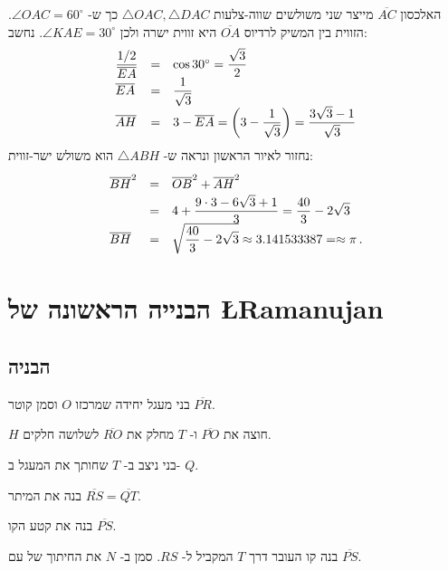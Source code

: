 האלכסון
$\overline{AC}$
מייצר שני משולשים שווה-צלעות
$\triangle OAC, \triangle DAC$
כך ש-%
$\angle OAC=60^\circ$.
הזווית בין המשיק לרדיוס
$\overline{OA}$
היא זווית ישרה ולכן
$\angle KAE=30^\circ$.
נחשב:
\begin{displaymath}
\renewcommand{\arraystretch}{1.5}
\begin{array}{lcl}
\disfrac{1/2}{\overline{EA}}&=&
\cos 30^\circ=\disfrac{\sqrt{3}}{2}\\
\overline{EA}&=&\disfrac{1}{\sqrt{3}}\\
\overline{AH}&=&3-\overline{EA}=\left(3-\disfrac{1}{\sqrt{3}}\right)
=\disfrac{3\sqrt{3}-1}{\sqrt{3}}\\
\end{array}
\end{displaymath}
נחזור לאיור הראשון ונראה ש-%
$\triangle ABH$
הוא משולש ישר-זווית:
\begin{displaymath}
\renewcommand{\arraystretch}{1.5}
\begin{array}{lcl}
\overline{BH}^2&=&\overline{OB}^2+\overline{AH}^2\\
&=&4+\disfrac{9\cdot 3 -6\sqrt{3}+1}{3}=\disfrac{40}{3}-2\sqrt{3}\\
\overline{BH}&=&\sqrt{\disfrac{40}{3}-2\sqrt{3}}\approx 3.141533387=\approx \pi\,.
\end{array}
\end{displaymath}



\vspace*{-16ex}

\section{הבנייה הראשונה של
\L{Ramanujan}}


\subsection{הבניה}

בני מעגל יחידה שמרכזו 
$O$
וסמן קוטר
$\overline{PR}$.

$H$
חוצה את
$\overline{PO}$
ו-%
$T$
מחלק את
$\overline{RO}$
לשלושה חלקים.

בני ניצב ב-%
$T$
שחותך את המעגל ב-%
$Q$.

בנה את המיתר
$\overline{RS}=\overline{QT}$.

בנה את קטע הקו
$\overline{PS}$.

בנה קו העובר דרך
$T$
המקביל ל-%
$RS$.
סמן ב-%
$N$
את החיתוך של עם 
$\overline{PS}$.

